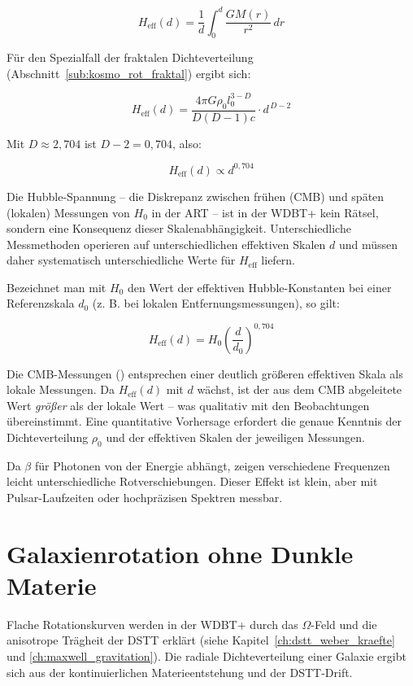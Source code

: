 \[
H_{\text{eff}}(d) = \frac{1}{d} \int_0^d \frac{GM(r)}{r^2} \, dr
\]

Für den Spezialfall der fraktalen Dichteverteilung (Abschnitt~\ref{sub:kosmo_rot_fraktal}) ergibt sich:

\[
H_{\text{eff}}(d) = \frac{4\pi G \rho_0 l_0^{3-D}}{D(D-1)c} \cdot d^{\,D-2}
\]

Mit \( D \approx 2,704 \) ist \( D-2 = 0,704 \), also:

\[
H_{\text{eff}}(d) \propto d^{0,704}
\]

Die Hubble-Spannung – die Diskrepanz zwischen frühen (CMB) und späten (lokalen) Messungen von \( H_0 \) in der ART – ist in der WDBT+ kein Rätsel, sondern eine Konsequenz dieser Skalenabhängigkeit. Unterschiedliche Messmethoden operieren auf unterschiedlichen effektiven Skalen \( d \) und müssen daher systematisch unterschiedliche Werte für \( H_{\text{eff}} \) liefern.

Bezeichnet man mit \( H_0 \) den Wert der effektiven Hubble-Konstanten bei einer Referenzskala \( d_0 \) (z. B. bei lokalen Entfernungsmessungen), so gilt:

\[
H_{\text{eff}}(d) = H_0 \left( \frac{d}{d_0} \right)^{0,704}
\]

Die CMB-Messungen (\cite{Planck2018}) entsprechen einer deutlich größeren effektiven Skala als lokale Messungen. Da \( H_{\text{eff}}(d) \) mit \( d \) wächst, ist der aus dem CMB abgeleitete Wert \textit{größer} als der lokale Wert – was qualitativ mit den Beobachtungen übereinstimmt. Eine quantitative Vorhersage erfordert die genaue Kenntnis der Dichteverteilung \( \rho_0 \) und der effektiven Skalen der jeweiligen Messungen.

Da \( \beta \) für Photonen von der Energie abhängt, zeigen verschiedene Frequenzen leicht unterschiedliche Rotverschiebungen. Dieser Effekt ist klein, aber mit Pulsar-Laufzeiten oder hochpräzisen Spektren messbar.

\section{Galaxienrotation ohne Dunkle Materie}
\label{sec:kosmo_galaxienrotation}

Flache Rotationskurven werden in der WDBT+ durch das \( \Omega \)-Feld und die anisotrope Trägheit der DSTT erklärt (siehe Kapitel~\ref{ch:dstt_weber_kraefte} und \ref{ch:maxwell_gravitation}). Die radiale Dichteverteilung einer Galaxie ergibt sich aus der kontinuierlichen Materieentstehung und der DSTT-Drift.

